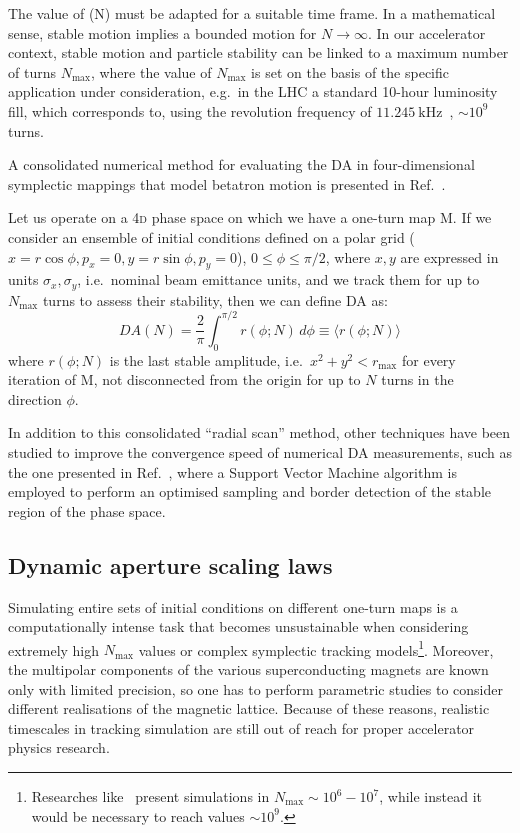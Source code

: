 The value of (N) must be adapted for a suitable time frame. In a mathematical sense, stable motion implies a bounded motion for \(N\rightarrow\infty\). In our accelerator context, stable motion and particle stability can be linked to a maximum number of turns \(N_{\text{max}}\), where the value of \(N_{\text{max}}\) is set on the basis of the specific application under consideration, e.g.\ in the LHC a standard 10-hour luminosity fill, which corresponds to, using the revolution frequency of \(\SI{11.245}{\kHz}\)~\cite{Benedikt:823808}, \(\sim 10^9\) turns.

A consolidated numerical method for evaluating the DA in four-dimensional symplectic mappings that model betatron motion is presented in Ref.~\cite{PhysRevE.53.4067}.

Let us operate on a 4\textsc{d} phase space on which we have a one-turn map \(\mathrm{M}\). If we consider an ensemble of initial conditions defined on a polar grid (\(x=r\cos\phi, p_x=0, y=r\sin\phi, p_y=0\)), \(0\leq\phi\leq\pi/2\), where \(x,y\) are expressed in units \(\sigma_x, \sigma_y\), i.e.\ nominal beam emittance units, and we track them for up to \(N_{\text{max}}\) turns to assess their stability, then we can define DA as:
\begin{equation}
	DA(N) = \frac{2}{\pi}\int_0^{\pi/2} r(\phi;N)\,d\phi \equiv \langle r(\phi;N)\rangle
	\label{eq:dynamic_aperture_numerical}
\end{equation}
where \(r(\phi;N)\) is the last stable amplitude, i.e.\ \(x^2 + y^2 < r_{\mathrm{max}}\) for every iteration of \(\mathrm{M}\), not disconnected from the origin for up to \(N\) turns in the direction \(\phi\). %

In addition to this consolidated ``radial scan'' method, other techniques have been studied to improve the convergence speed of numerical DA measurements, such as the one presented in Ref.~\cite{vanderveken:ipac2022-mopost047}, where a Support Vector Machine algorithm is employed to perform an optimised sampling and border detection of the stable region of the phase space.

\subsection{Dynamic aperture scaling laws}

Simulating entire sets of initial conditions on different one-turn maps is a computationally intense task that becomes unsustainable when considering extremely high \(N_{\text{max}}\) values or complex symplectic tracking models\footnote{Researches like~\cite{invlog} present simulations in $N_\text{max}\sim 10^6-10^7$, while instead it would be necessary to reach values \(\sim 10^9\).}. Moreover, the multipolar components of the various superconducting magnets are known only with limited precision, so one has to perform parametric studies to consider different realisations of the magnetic lattice. Because of these reasons, realistic timescales in tracking simulation are still out of reach for proper accelerator physics research.

